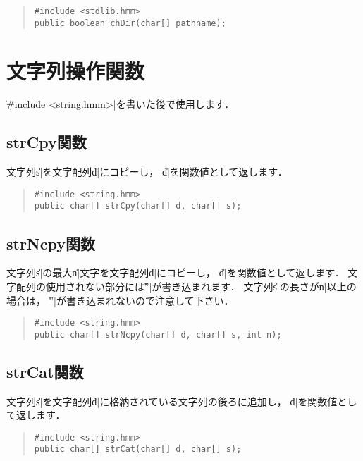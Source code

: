 \begin{quote}
\begin{verbatim}
#include <stdlib.hmm>
public boolean chDir(char[] pathname);
\end{verbatim}
\end{quote}

\section{文字列操作関数}

\|#include <string.hmm>|を書いた後で使用します．

\subsection{strCpy関数}

文字列\|s|を文字配列\|d|にコピーし，
\|d|を関数値として返します．

\begin{quote}
\begin{verbatim}
#include <string.hmm>
public char[] strCpy(char[] d, char[] s);
\end{verbatim}
\end{quote}

\subsection{strNcpy関数}

文字列\|s|の最大\|n|文字を文字配列\|d|にコピーし，
\|d|を関数値として返します．
文字配列の使用されない部分には\|'\0'|が書き込まれます．
文字列\|s|の長さが\|n|以上の場合は，
\|'\0'|が書き込まれないので注意して下さい．

\begin{quote}
\begin{verbatim}
#include <string.hmm>
public char[] strNcpy(char[] d, char[] s, int n);
\end{verbatim}
\end{quote}

\subsection{strCat関数}

文字列\|s|を文字配列\|d|に格納されている文字列の後ろに追加し，
\|d|を関数値として返します．

\begin{quote}
\begin{verbatim}
#include <string.hmm>
public char[] strCat(char[] d, char[] s);
\end{verbatim}
\end{quote}

